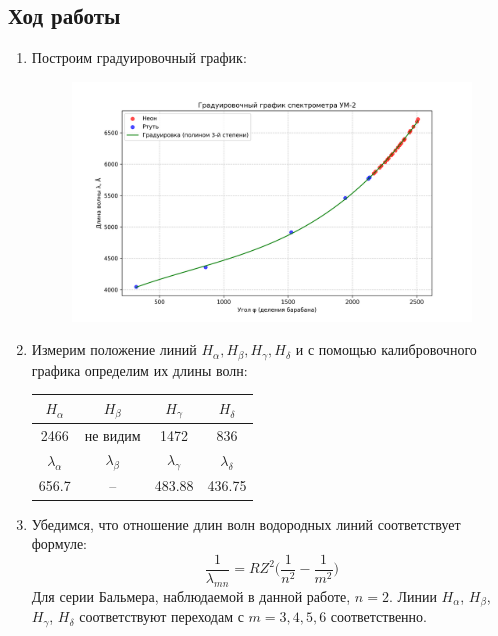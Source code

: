 \documentclass[a4paper,12pt]{article}
\begin{document}
\subsection{Ход работы}
\begin{enumerate}
    \item Построим градуировочный график:

    \begin{figure}[h]
    \centering
    \includegraphics[width=\linewidth]{graph1.png}
    \label{img2}
    \end{figure}

    \item Измерим положение линий $H_\alpha, H_\beta, H_\gamma, H_\delta$ и с помощью калибровочного графика определим их длины волн:

    \begin{table}[h!]
    \centering
    \begin{tabular}{||c|c|c|c||}
    \hline
    $H_\alpha$ & $H_\beta$ & $H_\gamma$ & $H_\delta$ \\
    \hline
    2466 & не видим & 1472 & 836 \\
    \hline
    \hline
    $\lambda_\alpha$ & $\lambda_\beta$ & $\lambda_\gamma$ & $\lambda_\delta$ \\
    \hline
    656.7 & -- & 483.88 & 436.75 \\
    \hline
    \end{tabular}
    \end{table}

    \item Убедимся, что отношение длин волн водородных линий соответствует формуле:
    $$
    \frac{1}{\lambda_{mn}}=RZ^2\Big(\frac{1}{n^2}-\frac{1}{m^2}\Big)
    $$
    Для серии Бальмера, наблюдаемой в данной работе, $n = 2$. Линии $H_\alpha$, $H_\beta$, $H_\gamma$, $H_\delta$ соответствуют переходам с $m = 3, 4, 5, 6$ соответственно.


\end{enumerate}
\end{document}

